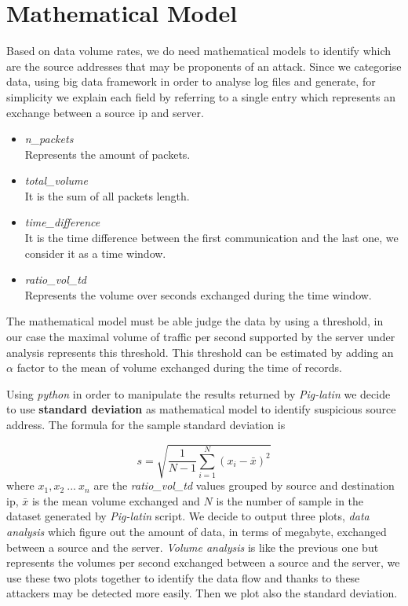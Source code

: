\section{Mathematical Model}
Based on data volume rates, we do need mathematical models to identify which are the source addresses that may be proponents of an attack. Since we categorise data, using big data framework in order to analyse log files and generate, for simplicity we explain each field by referring to a single entry which represents an exchange between a source ip and server.

\begin{itemize}
	\item \textit{n\_packets} \\ Represents the amount of packets.
	\item \textit{total\_volume} \\ It is the sum of all packets length.
	\item \textit{time\_difference} \\ It is the time difference between the first communication and the last one, we consider it as a time window.
	\item \textit{ratio\_vol\_td} \\ Represents the volume over seconds exchanged during the time window.
\end{itemize}

The mathematical model must be able judge the data \cite{detection_by_path_analaysis} by using a threshold, in our case the maximal volume of traffic per second supported by the server under analysis represents this threshold.
This threshold can be estimated by adding an $\alpha$ factor to the mean of volume exchanged during the time of records.

Using \textit{python} in order to manipulate the results returned by \textit{Pig-latin} we decide to use \textbf{standard deviation} as mathematical model to identify suspicious source address.
The formula for the sample standard deviation is

\begin{equation}
\label{eq:standard_dev}
	s = \sqrt{\frac{1}{N-1}\sum_{i=1}^N(x_i - \bar{x})^2}
\end{equation}
where $x_1, x_2\ ...\ x_n$ are the \textit{ratio\_vol\_td} values grouped by source and destination ip, $\bar{x}$ is the mean volume exchanged and $N$ is the number of sample in the dataset generated by \textit{Pig-latin} script. We decide to output three plots, \textit{data analysis} which figure out the amount of data, in terms of megabyte, exchanged between a source and the server. \textit{Volume analysis} is like the previous one but represents the volumes per second exchanged between a source and the server, we use these two plots together to identify the data flow and thanks to these attackers may be detected more easily. Then we plot also the standard deviation.
